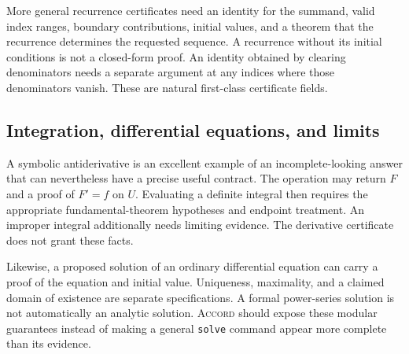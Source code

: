 \documentclass[11pt,a4paper]{article}
\newcommand{\code}[1]{\nolinkurl{#1}}
\newcommand{\Accord}{\textsc{Accord}}
\theoremstyle{definition}
\begin{document}
More general recurrence certificates need an identity for the summand, valid
index ranges, boundary contributions, initial values, and a theorem that the
recurrence determines the requested sequence. A recurrence without its initial
conditions is not a closed-form proof. An identity obtained by clearing
denominators needs a separate argument at any indices where those denominators
vanish. These are natural first-class certificate fields.

\subsection{Integration, differential equations, and limits}
A symbolic antiderivative is an excellent example of an incomplete-looking
answer that can nevertheless have a precise useful contract. The operation
may return $F$ and a proof of $F'=f$ on $U$. Evaluating a definite integral then
requires the appropriate fundamental-theorem hypotheses and endpoint treatment.
An improper integral additionally needs limiting evidence. The derivative
certificate does not grant these facts.

Likewise, a proposed solution of an ordinary differential equation can carry a
proof of the equation and initial value. Uniqueness, maximality, and a claimed
domain of existence are separate specifications. A formal power-series solution
is not automatically an analytic solution. \Accord{} should expose these
modular guarantees instead of making a general \code{solve} command appear
more complete than its evidence.
\end{document}
